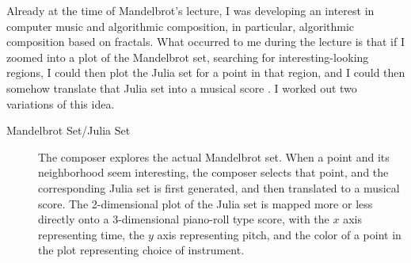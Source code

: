 \documentclass[11pt]{scrartcl}
\begin{document}
Already at the time of Mandelbrot's lecture, I was developing an interest in computer music and algorithmic composition, in particular, algorithmic composition based on fractals. What occurred to me during the lecture is that if I zoomed into a plot of the Mandelbrot set, searching for interesting-looking regions, I could then plot the Julia set for a point in that region, and I could then somehow translate that Julia set into a musical score \parencite{obsessed}. I worked out two variations of this idea.

\begin{description}
\item[Mandelbrot Set/Julia Set] The composer explores the actual Mandelbrot set. When a point and its neighborhood seem interesting, the composer selects that point, and the corresponding Julia set is first generated, and then translated to a musical score. The 2-dimensional plot of the Julia set is mapped more or less directly onto a 3-dimensional piano-roll type score, with the $x$ axis representing time, the $y$ axis representing pitch, and the color of a point in the plot representing choice of instrument.


\end{description}
\end{document}
